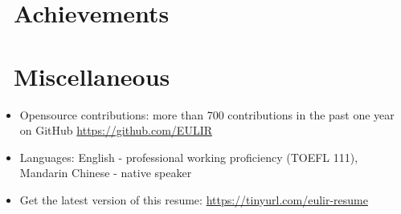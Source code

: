 \documentclass{resume}
\begin{document}
\section{\faHeartO\ Achievements}

\section{\faInfo\ Miscellaneous}
\begin{itemize}[parsep=0.5ex]
  \item Opensource contributions: more than 700 contributions in the past one year on GitHub \url{https://github.com/EULIR}
  \item Languages: English - professional working proficiency (TOEFL 111), Mandarin Chinese - native speaker
  \item Get the latest version of this resume: \url{https://tinyurl.com/eulir-resume}
\end{itemize}
\end{document}
